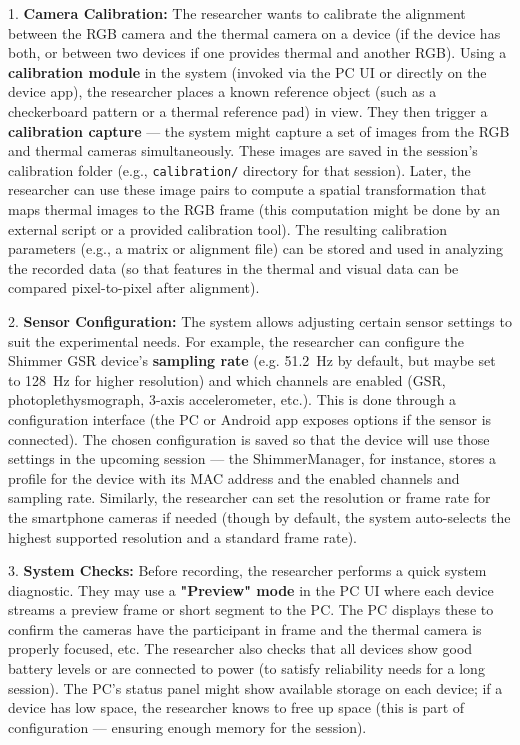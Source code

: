 1.  \textbf{Camera Calibration:} The researcher wants to calibrate the
    alignment between the RGB camera and the thermal camera on a device
    (if the device has both, or between two devices if one provides
    thermal and another RGB). Using a \textbf{calibration module} in the
    system (invoked via the PC UI or directly on the device app), the
    researcher places a known reference object (such as a checkerboard
    pattern or a thermal reference pad) in view. They then trigger a
    \textbf{calibration capture} --- the system might capture a set of images
    from the RGB and thermal cameras simultaneously. These images are
    saved in the session's calibration folder (e.g., \texttt{calibration/}
    directory for that
    session)\cite{StressDefinitionHH}\cite{CortisolStressIndicator2020}.
    Later, the researcher can use these image pairs to compute a spatial
    transformation that maps thermal images to the RGB frame (this
    computation might be done by an external script or a provided
    calibration tool). The resulting calibration parameters (e.g., a
    matrix or alignment file) can be stored and used in analyzing the
    recorded data (so that features in the thermal and visual data can
    be compared pixel-to-pixel after alignment).

2.  \textbf{Sensor Configuration:} The system allows adjusting certain sensor
    settings to suit the experimental needs. For example, the researcher
    can configure the Shimmer GSR device's \textbf{sampling rate} (e.g.
    51.2 Hz by default, but maybe set to 128 Hz for higher resolution)
    and which channels are enabled (GSR, photoplethysmograph, 3-axis
    accelerometer,
    etc.)\cite{ElectrodermalActivityWiki}\cite{ContactlessStressThermal2022}.
    This is done through a configuration interface (the PC or Android
    app exposes options if the sensor is connected). The chosen
    configuration is saved so that the device will use those settings in
    the upcoming session --- the ShimmerManager, for instance, stores a
    profile for the device with its MAC address and the enabled channels
    and sampling
    rate\cite{ContactlessStressThermal2022}.
    Similarly, the researcher can set the resolution or frame rate for
    the smartphone cameras if needed (though by default, the system
    auto-selects the highest supported resolution and a standard frame
    rate).

3.  \textbf{System Checks:} Before recording, the researcher performs a quick
    system diagnostic. They may use a \textbf{"Preview" mode} in the PC UI
    where each device streams a preview frame or short segment to the
    PC. The PC displays these to confirm the cameras have the
    participant in frame and the thermal camera is properly focused,
    etc. The researcher also checks that all devices show good battery
    levels or are connected to power (to satisfy reliability needs for a
    long session). The PC's status panel might show available storage on
    each device; if a device has low space, the researcher knows to free
    up space (this is part of configuration --- ensuring enough memory
    for the session).

